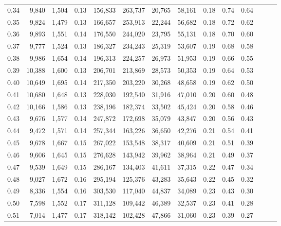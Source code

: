 \begin{tabular}{rrrrrrrrrrrrrr}
0.34 &   9,840 &  1,504 &  0.13 &  156,833 &  263,737 &  20,765 &  58,161 &  0.18 &  0.74 &      0.64 \\
0.35 &   9,824 &  1,479 &  0.13 &  166,657 &  253,913 &  22,244 &  56,682 &  0.18 &  0.72 &      0.62 \\
0.36 &   9,893 &  1,551 &  0.14 &  176,550 &  244,020 &  23,795 &  55,131 &  0.18 &  0.70 &      0.60 \\
0.37 &   9,777 &  1,524 &  0.13 &  186,327 &  234,243 &  25,319 &  53,607 &  0.19 &  0.68 &      0.58 \\
0.38 &   9,986 &  1,654 &  0.14 &  196,313 &  224,257 &  26,973 &  51,953 &  0.19 &  0.66 &      0.55 \\
0.39 &  10,388 &  1,600 &  0.13 &  206,701 &  213,869 &  28,573 &  50,353 &  0.19 &  0.64 &      0.53 \\
0.40 &  10,649 &  1,695 &  0.14 &  217,350 &  203,220 &  30,268 &  48,658 &  0.19 &  0.62 &      0.50 \\
0.41 &  10,680 &  1,648 &  0.13 &  228,030 &  192,540 &  31,916 &  47,010 &  0.20 &  0.60 &      0.48 \\
0.42 &  10,166 &  1,586 &  0.13 &  238,196 &  182,374 &  33,502 &  45,424 &  0.20 &  0.58 &      0.46 \\
0.43 &   9,676 &  1,577 &  0.14 &  247,872 &  172,698 &  35,079 &  43,847 &  0.20 &  0.56 &      0.43 \\
0.44 &   9,472 &  1,571 &  0.14 &  257,344 &  163,226 &  36,650 &  42,276 &  0.21 &  0.54 &      0.41 \\
0.45 &   9,678 &  1,667 &  0.15 &  267,022 &  153,548 &  38,317 &  40,609 &  0.21 &  0.51 &      0.39 \\
0.46 &   9,606 &  1,645 &  0.15 &  276,628 &  143,942 &  39,962 &  38,964 &  0.21 &  0.49 &      0.37 \\
0.47 &   9,539 &  1,649 &  0.15 &  286,167 &  134,403 &  41,611 &  37,315 &  0.22 &  0.47 &      0.34 \\
0.48 &   9,027 &  1,672 &  0.16 &  295,194 &  125,376 &  43,283 &  35,643 &  0.22 &  0.45 &      0.32 \\
0.49 &   8,336 &  1,554 &  0.16 &  303,530 &  117,040 &  44,837 &  34,089 &  0.23 &  0.43 &      0.30 \\
0.50 &   7,598 &  1,552 &  0.17 &  311,128 &  109,442 &  46,389 &  32,537 &  0.23 &  0.41 &      0.28 \\
0.51 &   7,014 &  1,477 &  0.17 &  318,142 &  102,428 &  47,866 &  31,060 &  0.23 &  0.39 &      0.27 \\

\end{tabular}
